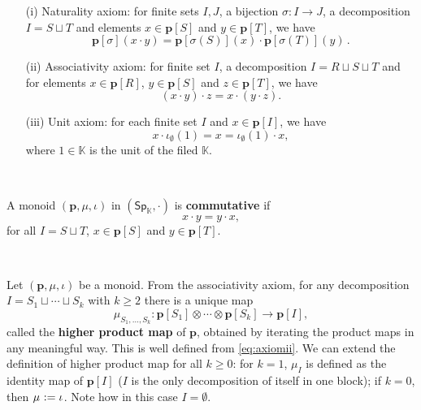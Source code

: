 \documentclass[12pt, reqno]{amsart}
\theoremstyle{definition}
\newcommand{\Ssk}{\mathsf{Sp}_\Kb} %
\newcommand{\Kb}{\mathbb{K}}
\newcommand{\tp}{\mathbf{p}}
\begin{document}
\begin{itemize}
    \item[(i)] Naturality axiom: for finite sets $I,J$, a bijection $\sigma: I \to J$, a decomposition $I=S \sqcup T$ and elements $x \in \tp[S]$ and $y \in \tp[T]$, we have
\begin{equation*}
\tp[\sigma](x \cdot y)=\tp[\sigma(S)](x) \cdot \tp[\sigma(T)](y) \, .
\end{equation*}

\item[(ii)] Associativity axiom: for finite set $I$, a decomposition $I=R \sqcup S \sqcup T$ and for elements $x \in \tp[R]$, $y \in \tp[S]$ and $z \in \tp[T]$, we have
\begin{equation}\label{eq:axiomii}
    (x \cdot y)\cdot z=x \cdot (y \cdot z).
\end{equation}

\item[(iii)] Unit axiom: for each finite set $I$ and $x \in \tp[I]$, we have
\begin{equation*}
 x \cdot \iota_\emptyset(1) = x =  \iota_\emptyset(1) \cdot x,
\end{equation*}
where $1\in \mathbb{K}$ is the unit of the filed $\mathbb{K}$.

\end{itemize}


\

A monoid $(\tp, \mu, \iota)$ in $(\Ssk, \cdot)$ is {\bf commutative} if
\begin{equation*}
    x\cdot y=y\cdot x,
\end{equation*}
for all $I=S \sqcup T$, $x \in \tp[S]$ and $y \in \tp[T]$.

\

Let $(\tp, \mu, \iota)$ be a monoid. From the associativity axiom, for any decomposition $I=S_1 \sqcup \cdots \sqcup S_k$ with $k \geq 2$ there is a unique map
\begin{equation}
    \mu_{S_1, \hdots, S_k}: \tp[S_1]\otimes \cdots \otimes \tp[S_k] \to \tp[I],
\end{equation}
called the {\bf higher product map} of $\tp$, obtained by iterating the product maps in any meaningful way. 
This is well defined from \eqref{eq:axiomii}.
We can extend the definition of higher product map for all $k\geq 0$: for $k=1$, $\mu_I$ is defined as the identity map of $\tp[I]$ ($I$ is the only decomposition of itself in one block); if $k=0$, then $\mu_{\empty}:=\iota_{\empty}$.
Note how in this case $I = \emptyset $.
\
\end{document}
